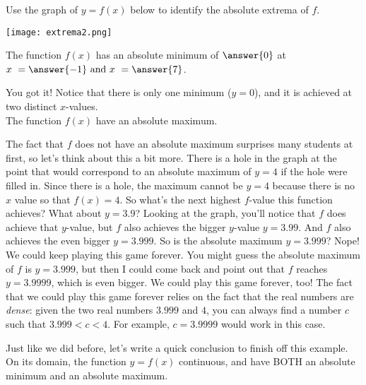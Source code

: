 \documentclass{ximera}
\begin{document}
\begin{exercise}
Use the graph of $y = f(x)$ below to identify the absolute extrema of $f$.

\begin{center} \texttt{[image: extrema2.png]} \end{center}

The function $f(x)$ has an absolute minimum of $\answer{0}$ at $x \ = \answer{-1} \text{ and } x \ = \answer{7}$.  

\begin{exercise}
You got it!  Notice that there is only one minimum ($y=0$), and it is achieved at two distinct $x$-values.  \\

The function $f(x)$  have an absolute maximum.  

\begin{explanation}
The fact that $f$ does not have an absolute maximum surprises many students at first, so let's think about this a bit more.  There is a hole in the graph at the point that would correspond to an absolute maximum of $y=4$ if the hole were filled in.  Since there is a hole, the maximum cannot be $y=4$ because there is no $x$ value so that $f(x) = 4$.  So what's the next highest $f$-value this function achieves?  What about $y=3.9$?  Looking at the graph, you'll notice that $f$ does achieve that $y$-value, but $f$ also achieves the bigger $y$-value $y=3.99$.  And $f$ also achieves the even bigger $y=3.999$.  So is the absolute maximum $y=3.999$?  Nope!  We could keep playing this game forever.  You might guess the absolute maximum of $f$ is $y=3.999$, but then I could come back and point out that $f$ reaches $y=3.9999$, which is even bigger.  We could play this game forever, too!  The fact that we could play this game forever relies on the fact that the real numbers are \textit{dense}: given the two real numbers $3.999$ and $4$, you can always find a number $c$ such that $3.999 < c < 4$.  For example, $c = 3.9999$ would work in this case.  
\end{explanation}
\begin{exercise}
Just like we did before, let's write a quick conclusion to finish off this example. \\

On its domain, the function $y=f(x)$  continuous, and  have BOTH an absolute minimum and an absolute maximum.  
\end{exercise}
\end{exercise}
\end{exercise}
\end{document}
